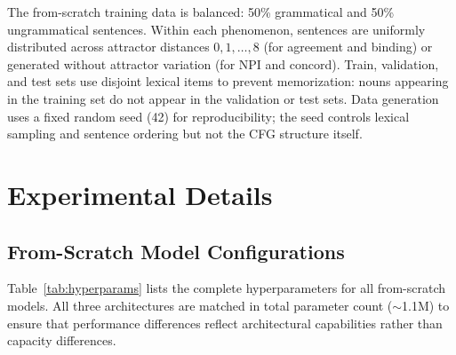\documentclass[11pt]{article}
\begin{document}
The from-scratch training data is balanced: 50\% grammatical and 50\% ungrammatical sentences.
Within each phenomenon, sentences are uniformly distributed across attractor distances $0, 1, \ldots, 8$ (for agreement and binding) or generated without attractor variation (for NPI and concord).
Train, validation, and test sets use disjoint lexical items to prevent memorization: nouns appearing in the training set do not appear in the validation or test sets.
Data generation uses a fixed random seed (42) for reproducibility; the seed controls lexical sampling and sentence ordering but not the CFG structure itself.

\section{Experimental Details}
\label{app:exp}

\subsection{From-Scratch Model Configurations}
\label{app:from-scratch}

Table~\ref{tab:hyperparams} lists the complete hyperparameters for all from-scratch models.
All three architectures are matched in total parameter count ($\sim$1.1M) to ensure that performance differences reflect architectural capabilities rather than capacity differences.
\end{document}
